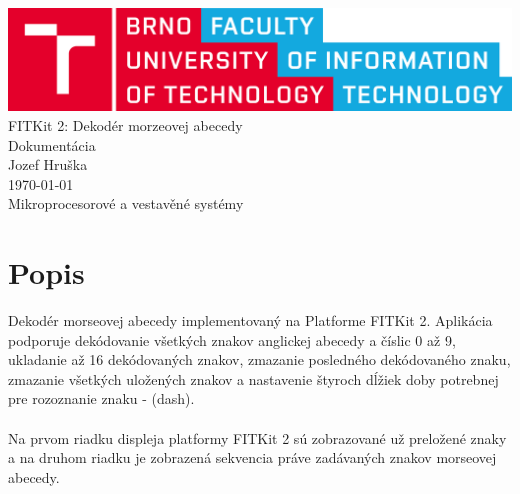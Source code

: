\documentclass{article}
\begin{document}
	\begin{titlepage}
		\centering
		\includegraphics[scale=0.1]{images/vut-fit-logo.png} \\
		\vspace{5cm}
		\Huge{FITKit 2: Dekodér morzeovej abecedy} \\
		\vspace{1cm}
		\Large{Dokumentácia} \\
		\vspace{4cm}
		\large{Jozef Hruška} \\
		\vspace{0.5cm}
		\normalsize{\today} \\
		\vfill
		Mikroprocesorové a vestavěné systémy
	\end{titlepage}
	
	\tableofcontents
	\clearpage
	
	\section{Popis}
	Dekodér morseovej abecedy implementovaný na Platforme FITKit 2. Aplikácia podporuje dekódovanie všetkých znakov anglickej abecedy a číslic 0 až 9, ukladanie až 16 dekódovaných znakov, zmazanie posledného dekódovaného znaku, zmazanie všetkých uložených znakov a nastavenie štyroch dĺžiek doby potrebnej pre rozoznanie znaku - (dash). \\\\
	Na prvom riadku displeja platformy FITKit 2 sú zobrazované už preložené znaky a na druhom riadku je zobrazená sekvencia práve zadávaných znakov morseovej abecedy.
	
\end{document}
